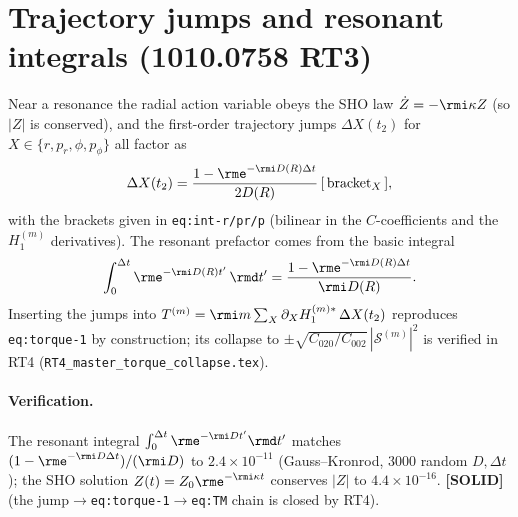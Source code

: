 \documentclass{article}
\begin{document}
\section*{Trajectory jumps and resonant integrals (1010.0758 RT3)}

Near a resonance the radial action variable obeys the SHO law $\dot Z=-\rmi\kappa Z$ (so $|Z|$ is conserved),
and the first-order trajectory jumps $\Delta X(t_2)$ for $X\in\{r,p_r,\phi,p_\phi\}$ all factor as
\begin{equation}
  \Delta X(t_2)=\frac{1-\rme^{-\rmi D(R)\Delta t}}{2D(R)}\,[\,\text{bracket}_X\,],
\end{equation}
with the brackets given in \texttt{eq:int-r/pr/p} (bilinear in the $C$-coefficients and the $H_1^{(m)}$
derivatives). The resonant prefactor comes from the basic integral
\begin{equation}
  \int_0^{\Delta t}\rme^{-\rmi D(R)t'}\,\rmd t'=\frac{1-\rme^{-\rmi D(R)\Delta t}}{\rmi D(R)} .
\end{equation}
Inserting the jumps into $T^{(m)}=\rmi m\sum_X \partial_X H_1^{(m)\ast}\,\Delta X(t_2)$ reproduces
\texttt{eq:torque-1} by construction; its collapse to $\pm\sqrt{C_{020}/C_{002}}\,|\mathcal{S}^{(m)}|^2$ is
verified in RT4 (\texttt{RT4\_master\_torque\_collapse.tex}).

\paragraph{Verification.} The resonant integral $\int_0^{\Delta t}\rme^{-\rmi Dt'}\rmd t'$ matches
$(1-\rme^{-\rmi D\Delta t})/(\rmi D)$ to $2.4\times10^{-11}$ (Gauss--Kronrod, 3000 random $D,\Delta t$); the SHO
solution $Z(t)=Z_0\rme^{-\rmi\kappa t}$ conserves $|Z|$ to $4.4\times10^{-16}$. \textbf{[SOLID]} (the
jump$\to$\texttt{eq:torque-1}$\to$\texttt{eq:TM} chain is closed by RT4).
\end{document}
